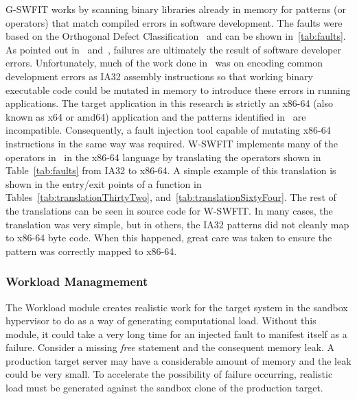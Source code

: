 G-SWFIT works by scanning binary libraries already in memory for
patterns (or operators) that match compiled errors in software development.
The faults were based on the Orthogonal Defect Classification~\cite{bridge1998}
and can be shown in~\ref{tab:faults}.  As pointed out in~\cite{salfnerSurvey}
and~\cite{gswfit}, failures are ultimately the result of software developer
errors.  Unfortunately, much of the work done in~\cite{gswfit} was on encoding
common development errors as IA32 assembly instructions so that working binary
executable code could be mutated in memory to introduce these errors in running
applications.  The target application in this research is strictly an x86-64
(also known as x64 or amd64) application and the patterns identified
in~\cite{gswfit} are incompatible.  Consequently, a fault injection tool
capable of mutating x86-64 instructions in the same way was required.  W-SWFIT
implements many of the operators in~\cite{gswfit} in the x86-64 language by
translating the operators shown in Table~\ref{tab:faults} from IA32 to x86-64.
A simple example of this translation is shown in the entry/exit points of a
function in Tables~\ref{tab:translationThirtyTwo},
and~\ref{tab:translationSixtyFour}.  The rest of the translations can be seen
in source code for W-SWFIT.  In many cases, the translation was very simple,
but in others, the IA32 patterns did not cleanly map to x86-64 byte code.  When
this happened, great care was taken to ensure the pattern was correctly mapped
to x86-64.

\tabFaults
\tabTranslationThirtyTwo
\tabTranslationSixtyFour

\subsubsection{Workload Managmement} \label{sec:workloadMgr} 
The Workload module creates realistic work for the target system in the sandbox
hypervisor to do as a way of generating computational load.  Without this
module, it could take a very long time for an injected fault to manifest itself
as a failure.  Consider a missing \emph{free} statement and the consequent
memory leak.  A production target server may have a considerable amount of
memory and the leak could be very small.  To accelerate the possibility of
failure occurring, realistic load must be generated against the sandbox clone
of the production target.

